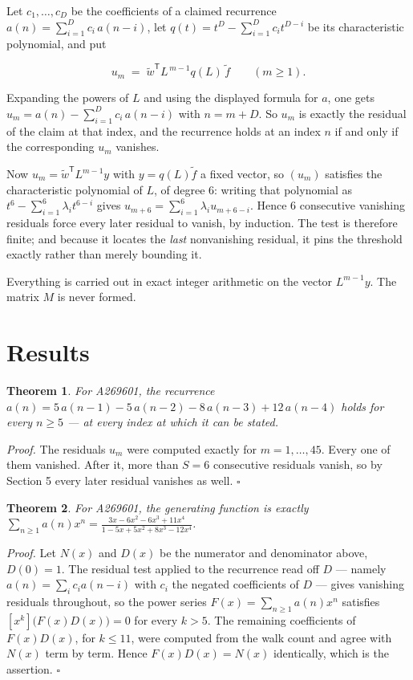 \documentclass[11pt]{article}
\newtheorem{theorem}{Theorem}
\theoremstyle{definition}
\begin{document}
Let $c_1,\dots,c_D$ be the coefficients of a claimed recurrence $a(n) = \sum_{i=1}^{D} c_i\,a(n-i)$, let $q(t) = t^{D} - \sum_{i=1}^{D} c_i t^{D-i}$ be its characteristic polynomial, and put

\[u_m \;=\; \tilde w^{\mathsf T} L^{\,m-1} q(L)\,\tilde f \qquad (m \ge 1).\]

Expanding the powers of $L$ and using the displayed formula for $a$, one gets $u_m = a(n) - \sum_{i=1}^{D} c_i\,a(n-i)$ with $n = m + D$. So $u_m$ is exactly the residual of the claim at that index, and the recurrence holds at an index $n$ if and only if the corresponding $u_m$ vanishes.

Now $u_m = \tilde w^{\mathsf T} L^{m-1} y$ with $y = q(L)\tilde f$ a fixed vector, so $(u_m)$ satisfies the characteristic polynomial of $L$, of degree $6$: writing that polynomial as $t^{6} - \sum_{i=1}^{6} \lambda_i t^{6-i}$ gives $u_{m+6} = \sum_{i=1}^{6} \lambda_i u_{m+6-i}$. Hence $6$ consecutive vanishing residuals force every later residual to vanish, by induction. The test is therefore finite; and because it locates the {\itshape last} nonvanishing residual, it pins the threshold exactly rather than merely bounding it.

Everything is carried out in exact integer arithmetic on the vector $L^{m-1}y$. The matrix $M$ is never formed.

\section{Results}

\begin{theorem} For A269601, the recurrence $a(n) = 5\,a(n-1) - 5\,a(n-2) - 8\,a(n-3) + 12\,a(n-4)$ holds for every $n \ge 5$ --- at every index at which it can be stated.\end{theorem}

{\itshape Proof.} The residuals $u_m$ were computed exactly for $m = 1,\dots,45$. Every one of them vanished. After it, more than $S = 6$ consecutive residuals vanish, so by Section 5 every later residual vanishes as well. $\square$

\begin{theorem} For A269601, the generating function is exactly $\sum_{n\ge 1} a(n)x^n = \frac{3x - 6x^{2} - 6x^{3} + 11x^{4}}{1 - 5x + 5x^{2} + 8x^{3} - 12x^{4}}$.\end{theorem}

{\itshape Proof.} Let $N(x)$ and $D(x)$ be the numerator and denominator above, $D(0)=1$. The residual test applied to the recurrence read off $D$ --- namely $a(n) = \sum_i c_i a(n-i)$ with $c_i$ the negated coefficients of $D$ --- gives vanishing residuals throughout, so the power series $F(x)=\sum_{n\ge 1}a(n)x^n$ satisfies $[x^k]\bigl(F(x)D(x)\bigr) = 0$ for every $k > 5$. The remaining coefficients of $F(x)D(x)$, for $k \le 11$, were computed from the walk count and agree with $N(x)$ term by term. Hence $F(x)D(x) = N(x)$ identically, which is the assertion. $\square$
\end{document}
